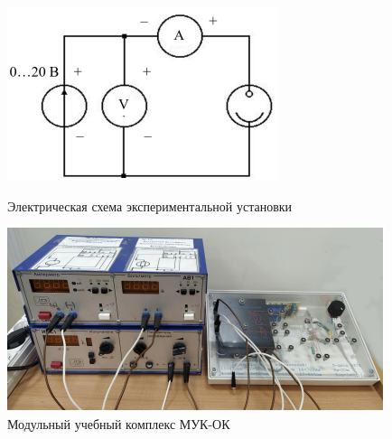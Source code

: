 \begin{figure}[H]
    \centering
    \begin{minipage}{0.48\linewidth}
        \centering
        \def\thefigure{6.4}
        \protect{}
        \includegraphics[width=0.9\linewidth]{figs/6-4.png}
        \caption{Электрическая схема экспериментальной установки}
        \label{fig:circuit}
    \end{minipage}\hfill
    \begin{minipage}{0.48\linewidth}
        \centering
        \def\thefigure{6.5}
        \protect{}
        \includegraphics[width=0.9\linewidth]{figs/6-5.png}
        \caption{Модульный учебный комплекс МУК-ОК}
        \label{fig:setup}
    \end{minipage}
\end{figure}

